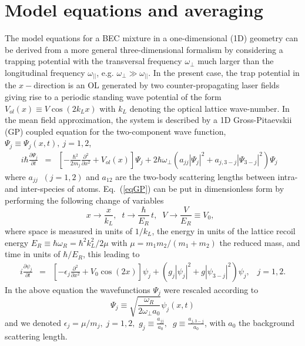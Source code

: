 \documentclass[12pt]{iopart}
\begin{document}
\section{Model equations and averaging}
The model equations for a  BEC mixture in a one-dimensional (1D) geometry can be derived from a more general three-dimensional
formalism by considering a trapping potential with the transversal frequency $\omega_\perp$ much larger than the longitudinal frequency $\omega_{||}$, e.g.
$\omega_\perp\gg\omega_{||}$. In the present case, the trap potential in the $x-$direction is an OL generated by two counter-propagating laser fields giving rise to a periodic standing wave potential of the form $V_{ol}(x)\equiv V \cos(2k_L x)$ with $k_L$ denoting the optical lattice wave-number. In the mean field approximation, the system is described by a
1D Gross-Pitaevskii (GP) coupled equation for the two-component wave function, $\Psi_j\equiv\Psi_j (x,t), \ j=1,2$,
\begin{eqnarray}
i\hbar\frac{\partial \Psi_{j}}{\partial t} & =&\left[
-\frac{\hbar^2}{2m_j}\frac{\partial^2}{\partial x^2 }
+V_{ol}(x) \right]\Psi_j + 2\hbar\omega_\perp(a_{jj}|\Psi_j|^2 + a_{j,3-j}|\Psi_{3-j}|^2)\Psi_j
\;\;\;
\label{eqGP}
\end{eqnarray}
where  $a_{jj}\;\;(j=1,2)$ and $a_{12}$ are the two-body scattering lengths between
intra- and inter-species of atoms. Eq.~(\ref{eqGP}) can be put in dimensionless form by performing the following change of variables
\begin{equation}
x\to\frac{x}{k_L},\;\; t\to \frac{\hbar}{E_R}\, t, \;\; V\to \frac{V}{E_R}\equiv V_0, \;\;
\end{equation}
where space is measured in units of $1/k_L$, the energy in units of the lattice recoil energy $E_R \equiv \hbar \omega_R= \hbar^2 k_L^2/2 \mu$ with  $\mu=m_1 m_2/(m_1+m_2)$ the reduced mass,  and time in units of $\hbar/E_R$, this leading to
\begin{eqnarray}
i \frac{\partial \psi_{j}}{\partial t} & =& \left[- \epsilon_j \frac{\partial^2}{\partial x^2} + V_0 \cos (2 x) \right] \psi_{j} +  (g_j |\psi_{j}|^2+ {g} |\psi_{3-j}|^2) \psi_j, \;\;\;j=1,2.
\label{normGPE}
\end{eqnarray}
In the above equation the wavefunctions $\Psi_j$ were rescaled according to
\begin{equation}
\Psi_j\equiv\sqrt{\frac{\omega_R}{2\omega_{\perp}a_0}}  \psi_j(x,t)
\end{equation}
and we denoted $\epsilon_j= \mu/m_j, \; j=1,2,$ $g_j\equiv\frac{a_{jj}}{a_0},\;\; g\equiv\frac{a_{j,3-j}}{a_0}$, with $a_0$ the background scattering length.
\end{document}

